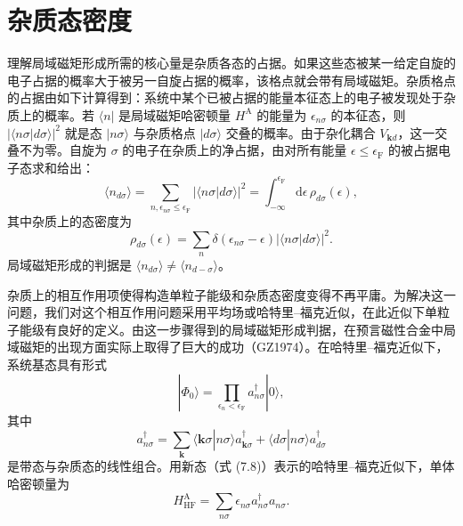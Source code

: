 \section{杂质态密度}

理解局域磁矩形成所需的核心量是杂质各态的占据。如果这些态被某一给定自旋的电子占据的概率大于被另一自旋占据的概率，该格点就会带有局域磁矩。杂质格点的占据由如下计算得到：系统中某个已被占据的能量本征态上的电子被发现处于杂质上的概率。若 $\langle n|$ 是局域磁矩哈密顿量 $H^{\mathrm{A}}$ 的能量为 $\epsilon_{n\sigma}$ 的本征态，则 $|\langle n\sigma|d\sigma\rangle|^{2}$ 就是态 $|n\sigma\rangle$ 与杂质格点 $|d\sigma\rangle$ 交叠的概率。由于杂化耦合 $V_{\mathbf{k}d}$，这一交叠不为零。自旋为 $\sigma$ 的电子在杂质上的净占据，由对所有能量 $\epsilon\leq\epsilon_{\mathrm{F}}$ 的被占据电子态求和给出：
\begin{equation*}
\langle n_{d\sigma}\rangle=\sum_{n,\epsilon_{n\sigma}\leq\epsilon_{\mathrm{F}}}|\langle n\sigma|d\sigma\rangle|^{2}=\int_{-\infty}^{\epsilon_{\mathrm{F}}}\mathrm{d}\epsilon\,\rho_{d\sigma}(\epsilon),\tag{7.5}
\end{equation*}
其中杂质上的态密度为
\begin{equation*}
\rho_{d\sigma}(\epsilon)=\sum_{n}\delta(\epsilon_{n\sigma}-\epsilon)|\langle n\sigma|d\sigma\rangle|^{2}.\tag{7.6}
\end{equation*}
局域磁矩形成的判据是 $\langle n_{d\sigma}\rangle\neq\langle n_{d-\sigma}\rangle$。

杂质上的相互作用项使得构造单粒子能级和杂质态密度变得不再平庸。为解决这一问题，我们对这个相互作用问题采用平均场或哈特里–福克近似，在此近似下单粒子能级有良好的定义。由这一步骤得到的局域磁矩形成判据，在预言磁性合金中局域磁矩的出现方面实际上取得了巨大的成功（GZ1974）。在哈特里–福克近似下，系统基态具有形式
\begin{equation*}
|\Phi_{0}\rangle=\prod_{\epsilon_{n}<\epsilon_{\mathrm{F}}}a_{n\sigma}^{\dagger}|0\rangle,\tag{7.7}
\end{equation*}
其中
\begin{equation*}
a_{n\sigma}^{\dagger}=\sum_{\mathbf{k}}\langle\mathbf{k}\sigma|n\sigma\rangle a_{\mathbf{k}\sigma}^{\dagger}+\langle d\sigma|n\sigma\rangle a_{d\sigma}^{\dagger}\tag{7.8}
\end{equation*}
是带态与杂质态的线性组合。用新态（式 (7.8)）表示的哈特里–福克近似下，单体哈密顿量为
\begin{equation*}
H_{\mathrm{HF}}^{\mathrm{A}}=\sum_{n\sigma}\epsilon_{n\sigma}a_{n\sigma}^{\dagger}a_{n\sigma}.\tag{7.9}
\end{equation*}

